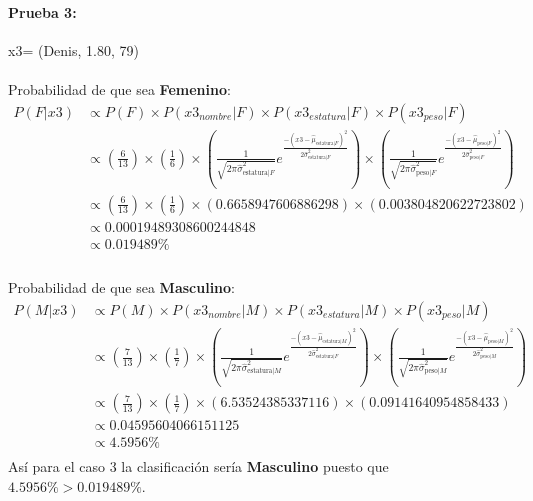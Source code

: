 \documentclass[12pt]{article}
\begin{document}
 \paragraph{Prueba 3: }x3= (Denis, 1.80, 79)
 \paragraph{}Probabilidad de que sea \textbf{Femenino}:\\
 \begin{equation}
 \begin{split}
 P(F|x3) &\propto P(F) \times P(x3_{nombre}|F) \times P(x3_{estatura}|F) \times P(x3_{peso}|F) \\
 &\propto (\frac{6}{13}) \times (\frac{1}{6}) \times (\frac{1}{\sqrt{2\pi\hat{\sigma}_{\text{estatura}|F}^2}}e^{\frac{-(x3 - \hat{\mu}_{\text{estatura}|F})^2}{2\hat{\sigma}_{\text{estatura}|F}^2}}) \times (\frac{1}{\sqrt{2\pi\hat{\sigma}_{\text{peso}|F}^2}}e^{\frac{-(x3 - \hat{\mu}_{\text{peso}|F})^2}{2\hat{\sigma}_{\text{peso}|F}^2}}) \\
 &\propto (\frac{6}{13}) \times (\frac{1}{6}) \times (0.6658947606886298) \times (0.003804820622723802) \\
 &\propto 0.00019489308600244848 \\
 &\propto 0.019489\% \\
 \end{split}
 \end{equation}
 \paragraph{}Probabilidad de que sea \textbf{Masculino}:\\
 \begin{equation}
 \begin{split}
 P(M|x3) &\propto P(M) \times P(x3_{nombre}|M) \times P(x3_{estatura}|M) \times P(x3_{peso}|M) \\
 &\propto (\frac{7}{13}) \times (\frac{1}{7}) \times (\frac{1}{\sqrt{2\pi\hat{\sigma}_{\text{estatura}|M}^2}}e^{\frac{-(x3 - \hat{\mu}_{\text{estatura}|M})^2}{2\hat{\sigma}_{\text{estatura}|F}^2}}) \times (\frac{1}{\sqrt{2\pi\hat{\sigma}_{\text{peso}|M}^2}}e^{\frac{-(x3 - \hat{\mu}_{\text{peso}|M})^2}{2\hat{\sigma}_{\text{peso}|M}^2}}) \\
 &\propto (\frac{7}{13}) \times (\frac{1}{7}) \times (6.53524385337116) \times (0.09141640954858433) \\
 &\propto 0.04595604066151125 \\
 &\propto 4.5956 \% \\
 \end{split}
 \end{equation}
 Así para el caso 3 la clasificación sería \textbf{Masculino} puesto que $4.5956\% > 0.019489\%$.\\
 \clearpage
 \pagebreak
\end{document}
